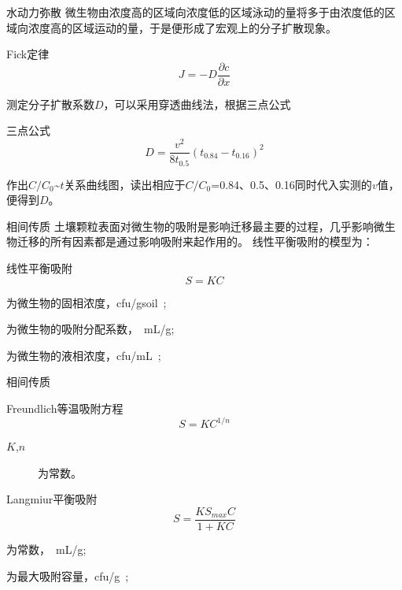 \documentclass[xcolor=dvipsnames]{beamer}
\begin{document}
	\begin{frame}{水动力弥散}
	微生物由浓度高的区域向浓度低的区域泳动的量将多于由浓度低的区域向浓度高的区域运动的量，于是便形成了宏观上的分子扩散现象。
	\begin{block}{\fangsong Fick定律}
		\begin{equation}
		J=-D\dfrac{\partial c}{\partial x}
		\end{equation}
	\end{block}
	测定分子扩散系数$D$，可以采用穿透曲线法，根据三点公式
	\begin{block}{\fangsong 三点公式}
	\begin{equation}
		D=\dfrac{v^2}{8t_{0.5}}(t_{0.84}-t_{0.16})^2
	\end{equation}
	\end{block}
	作出$C/C_0$\~$t$关系曲线图，读出相应于$C/C_0$=0.84、0.5、0.16同时代入实测的$v$值，便得到$D$。
	\end{frame}
	\begin{frame}{相间传质}
	土壤颗粒表面对微生物的吸附是影响迁移最主要的过程，几乎影响微生物迁移的所有因素都是通过影响吸附来起作用的。
	线性平衡吸附的模型为：
	\begin{block}{\fangsong 线性平衡吸附}
	\begin{equation}
	S=KC
	\end{equation}
	\end{block}
	\begin{description}\setlength{\itemsep}{0em}
	\item[$S$]为微生物的固相浓度，\SI{cfu/gsoil};
	\item[$K$]为微生物的吸附分配系数，\SI{}{mL/g};
	\item[$C$]为微生物的液相浓度，\SI{cfu/mL};
	\end{description}
	\end{frame}
	\begin{frame}{相间传质}
	\begin{block}{\fangsong Freundlich等温吸附方程}
		\begin{equation}
		S=KC^{1/n}
		\end{equation}
	\end{block}
	\begin{description}
	\item[$K$,$n$]为常数。
	\end{description}
	\begin{block}{\fangsong Langmiur平衡吸附}
	\begin{equation}
	S=\dfrac{KS_{max}C}{1+KC}
	\end{equation}
	\end{block}
	\begin{description}\setlength{\itemsep}{0em}
	\item[$K$]为常数，\SI{}{mL/g};
	\item[$S_{max}$]为最大吸附容量，\SI{cfu/g};
	\end{description}
	\end{frame}
\end{document}

